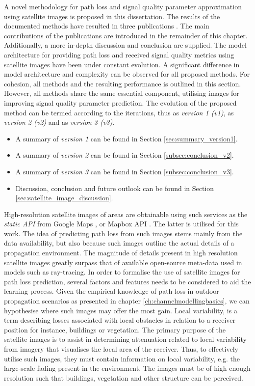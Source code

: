 A novel methodology for path loss and signal quality parameter approximation using satellite images is proposed in this dissertation. The results of the documented methods have resulted in three publications \cite{Thrane2018DriveApproximation, Thrane020ModelAidedDeepLearning, Thrane2020DeepKnowledge}. The main contributions of the publications are introduced in the remainder of this chapter. Additionally, a more in-depth discussion and conclusion are supplied. The model architecture for providing path loss and received signal quality metrics using satellite images have been under constant evolution. A significant difference in model architecture and complexity can be observed for all proposed methods.  For cohesion, all methods and the resulting performance is outlined in this section. However, all methods share the same essential component, utilising images for improving signal quality parameter prediction. The evolution of the proposed method can be termed according to the iterations, thus \cite{Thrane2018DriveApproximation} as \emph{version 1 (v1)}, \cite{Thrane020ModelAidedDeepLearning} as \emph{version 2 (v2)} and \cite{Thrane2020DeepKnowledge} as \emph{version 3 (v3)}. 
\begin{itemize}
    \item A summary of \emph{version 1} can be found in Section \ref{sec:summary_version1}.
    \item A summary of \emph{version 2} can be found in Section \ref{subsec:conclusion_v2}.
    \item A summary of \emph{version 3} can be found in Section \ref{subsec:conclusion_v3}.
    \item Discussion, conclusion and future outlook can be found in Section \ref{sec:satellite_image_discussion}.
\end{itemize}
\noindent
High-resolution satellite images of areas are obtainable using such services as the \emph{static API} from Google Maps \cite{GoogleAPI}, or Mapbox API \cite{MapboxWebsite}. The latter is utilised for this work. The idea of predicting path loss from such images stems mainly from the data availability, but also because such images outline the actual details of a propagation environment. The magnitude of details present in high resolution satellite images greatly surpass that of available open-source meta-data used in models such as ray-tracing. In order to formalise the use of satellite images for path loss prediction, several factors and features needs to be considered to aid the learning process. Given the empirical knowledge of path loss in outdoor propagation scenarios as presented in chapter \ref{ch:channelmodellingbasics}, we can hypothesise where such images may offer the most gain. Local variability, is a term describing losses associated with local obstacles in relation to a receiver position for instance, buildings or vegetation. The primary purpose of the satellite images is to assist in determining attenuation related to local variability from imagery that visualises the local area of the receiver. Thus, to effectively utilise such images, they must contain information on local variability, e.g. the large-scale fading present in the environment. The images must be of high enough resolution such that buildings, vegetation and other structure can be perceived.


